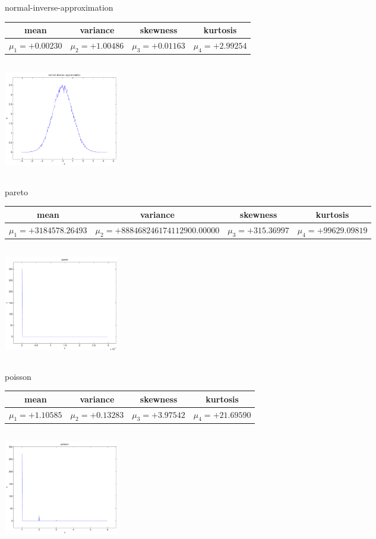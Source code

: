 \documentclass[9pt]{article}
\theoremstyle{plain}
\theoremstyle{definition}
\theoremstyle{remark}
\numberwithin{equation}{section}
\begin{document}
\newpage
normal-inverse-approximation \begin{tabular}{|c|c|c|c|}  mean & variance & skewness & kurtosis \\  \hline
$\mu_1 = +0.00230$ & $\mu_2 = +1.00486$ & $\mu_3 = +0.01163$ & $\mu_4 =+2.99254$ \\
\end{tabular}

\includegraphics[width=5cm,height=5cm]{normal-inverse-approximation.pdf}

pareto \begin{tabular}{|c|c|c|c|}  mean & variance & skewness & kurtosis \\  \hline
$\mu_1 = +3184578.26493$ & $\mu_2 = +888468246174112900.00000$ & $\mu_3 = +315.36997$ & $\mu_4 =+99629.09819$ \\
\end{tabular}

\includegraphics[width=5cm,height=5cm]{pareto.pdf}

poisson \begin{tabular}{|c|c|c|c|}  mean & variance & skewness & kurtosis \\  \hline
$\mu_1 = +1.10585$ & $\mu_2 = +0.13283$ & $\mu_3 = +3.97542$ & $\mu_4 =+21.69590$ \\
\end{tabular}

\includegraphics[width=5cm,height=5cm]{poisson.pdf}
\end{document}
